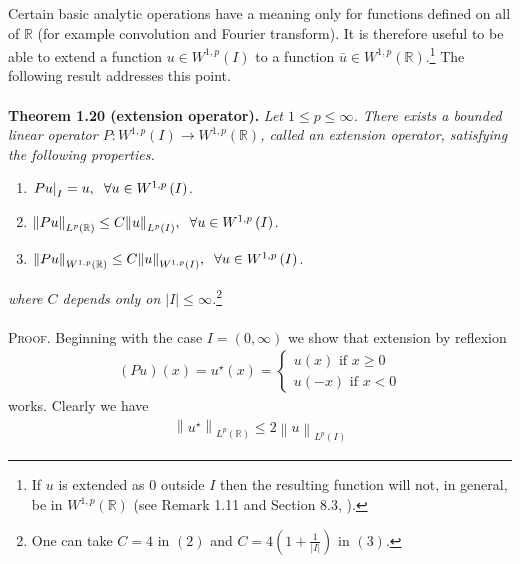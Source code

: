 \documentclass[a4paper,oneside]{article}
\numberwithin{equation}{section}
\begin{document}
Certain basic analytic operations have a meaning only for functions defined on all of $\mathbb{R}$ (for example convolution and Fourier transform). It is therefore useful to be able to extend a function $u\in W^{1,p}\left(I\right)$ to a function $\bar{u} \in W^{1,p} \left(\mathbb{R}\right)$.\footnote{If $u$ is extended as 0 outside $I$ then the resulting function will not, in general, be in $W^{1,p}\left(\mathbb{R}\right)$ (see Remark 1.11 and Section 8.3, \cite{1}).} The following result addresses this point.\\
\\
\textbf{Theorem 1.20 (extension operator).} \textit{Let $1\le p\le \infty$. There exists a bounded linear operator $P:{W^{1,p}}\left( I \right) \to {W^{1,p}}\left( \mathbb{R} \right)$, called an extension operator, satisfying the following properties.}
\begin{enumerate}
\item ${\left. {Pu} \right|_I} = u,\hspace{0.2cm}\forall u \in {W^{1,p}}\left( I \right)$.
\item ${\left\| {Pu} \right\|_{{L^p}\left( \mathbb{R} \right)}} \le C{\left\| u \right\|_{{L^p}\left( I \right)}},\hspace{0.2cm}\forall u \in {W^{1,p}}\left( I \right)$.
\item ${\left\| {Pu} \right\|_{{W^{1,p}}\left( \mathbb{R} \right)}} \le C{\left\| u \right\|_{{W^{1,p}}\left( I \right)}},\hspace{0.2cm}\forall u \in {W^{1,p}}\left( I \right)$.
\end{enumerate}
\textit{where $C$ depends only on $\left| I \right| \le \infty $.}\footnote{One can take $C=4$ in $\left(2\right)$ and $C = 4\left( {1 + \frac{1}{{\left| I \right|}}} \right)$ in $\left(3\right)$.}\\
\\
\textsc{Proof.} Beginning with the case $I=\left(0,\infty\right)$ we show that extension by reflexion
\begin{align}
\left( {Pu} \right)\left( x \right) = u^{\star}\left( x \right) = \left\{ {\begin{array}{*{20}{c}}
{u\left( x \right)\mbox{ if } x \ge 0}\\
{u\left( { - x} \right)\mbox{ if } x < 0}
\end{array}} \right.
\end{align}
works. Clearly we have
\begin{align}
\label{1.131}
{\left\| {u^{\star}} \right\|_{{L^p}\left( \mathbb{R} \right)}} \le 2{\left\| u \right\|_{{L^p}\left( I \right)}}
\end{align}
\end{document}
